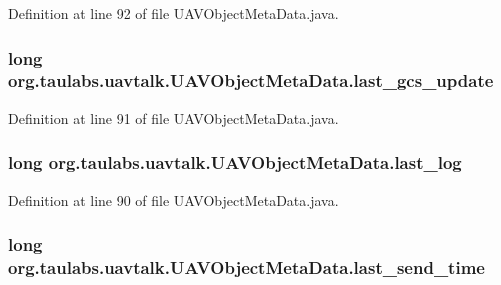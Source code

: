 \-Definition at line 92 of file \-U\-A\-V\-Object\-Meta\-Data.\-java.

\hypertarget{classorg_1_1taulabs_1_1uavtalk_1_1_u_a_v_object_meta_data_adb3b540f639d528b47ef5d103c5efef6}{
\subsubsection[{last\-\_\-gcs\-\_\-update}]{\setlength{\rightskip}{0pt plus 5cm}long {\bf org.\-taulabs.\-uavtalk.\-U\-A\-V\-Object\-Meta\-Data.\-last\-\_\-gcs\-\_\-update}}}\label{classorg_1_1taulabs_1_1uavtalk_1_1_u_a_v_object_meta_data_adb3b540f639d528b47ef5d103c5efef6}


\-Definition at line 91 of file \-U\-A\-V\-Object\-Meta\-Data.\-java.

\hypertarget{classorg_1_1taulabs_1_1uavtalk_1_1_u_a_v_object_meta_data_a4a4cd39c7d3cf13105d9253d7e321185}{
\subsubsection[{last\-\_\-log}]{\setlength{\rightskip}{0pt plus 5cm}long {\bf org.\-taulabs.\-uavtalk.\-U\-A\-V\-Object\-Meta\-Data.\-last\-\_\-log}}}\label{classorg_1_1taulabs_1_1uavtalk_1_1_u_a_v_object_meta_data_a4a4cd39c7d3cf13105d9253d7e321185}


\-Definition at line 90 of file \-U\-A\-V\-Object\-Meta\-Data.\-java.

\hypertarget{classorg_1_1taulabs_1_1uavtalk_1_1_u_a_v_object_meta_data_aba089a420a184ae520b7d23e3ec8fc3c}{
\subsubsection[{last\-\_\-send\-\_\-time}]{\setlength{\rightskip}{0pt plus 5cm}long {\bf org.\-taulabs.\-uavtalk.\-U\-A\-V\-Object\-Meta\-Data.\-last\-\_\-send\-\_\-time}}}\label{classorg_1_1taulabs_1_1uavtalk_1_1_u_a_v_object_meta_data_aba089a420a184ae520b7d23e3ec8fc3c}


